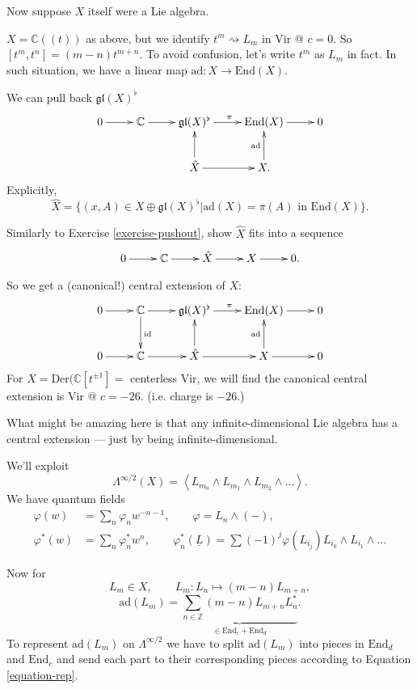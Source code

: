 \noindent
Now suppose $X$ itself were a Lie algebra.

\begin{example}
\label{example-with-X-lie-algebra}
$X=\mathbb{C}((t))$ as above, but we identify
$t^m \rightsquigarrow L_m$ in Vir @ $c=0$.
So  $[t^m,t^n]=(m-n)t^{m+n}$.
To avoid confusion, let's write $t^m$ as $L_m$ in fact.
In such situation, we have a linear map
$\text{ad}:X \to \text{End}(X)$.

We can pull back $\mathfrak{gl}(X)^\flat$ 
$$
\xymatrix{
0\ar[r]&\mathbb{C}\ar[r]
&\mathfrak{gl}(X)^\flat\ar[r]^\pi
&\text{End}(X)\ar[r]&0\\
&& \hat{X}\ar[r]\ar[u]& X\ar[u]^{\text{ad}}.
}
$$
Explicitly,
$$
\hat{X}=
\{(x,A) \in X \oplus \mathfrak{gl}(X)^\flat
|\text{ad}(X)=\pi(A) \text{ in }\text{End}(X)\}.
$$
\end{example}

\begin{exercise}
\label{exercise-pushout2}
Similarly to Exercise \ref{exercise-pushout},
show $\hat{X}$ fits into a sequence
$$
\xymatrix{
0\ar[r]&\mathbb{C}\ar[r]&\hat{X}\ar[r]&X\ar[r]&0.
}
$$
\end{exercise}
So we get a (canonical!) central extension of $X$:
$$
\xymatrix{
0\ar[r]&\mathbb{C}\ar[d]^{\text{id}}\ar[r]
&\mathfrak{gl}(X)^\flat\ar[r]^\pi
&\text{End}(X)\ar[r]&0\\
0\ar[r]&\mathbb{C}\ar[r]&\hat{X}\ar[u]\ar[r]& X\ar[u]^{\text{ad}}\ar[r]&0
}
$$
For $X=\text{Der}(\mathbb{C}[t^{\pm 1}]=$ centerless Vir,
we will find the canonical central extension is
Vir  @ $c=-26$. (i.e. charge is  $-26$.)

\noindent
What might be amazing here is that any infinite-dimensional
Lie algebra has a central extension --- just by being infinite-dimensional.

\medskip\noindent
We'll exploit
$$
\Lambda^{\infty/2}(X)
=\left<L_{m_0}\wedge L_{m_1}\wedge L_{m_2}\wedge\ldots\right>.
$$
We have quantum fields
\begin{align*}
\varphi(w)&=\sum_n\varphi_nw^{-n-1},\qquad 
\varphi=L_n \wedge(-),\\
\varphi^* (w)&=\sum_n \varphi_n^* w^n,\qquad 
\varphi_n^* (\underline{L})=
\sum(-1)^j\varphi(L_{i_j})L_{i_0}\wedge L_{i_1}\wedge\ldots
\end{align*}

\noindent
Now for 
$$
L_m \in X,\qquad  L_m :L_n \mapsto  (m-n)L_{m+n},
$$
$$
\text{ad}(L_m)=\underbrace{\sum_{n \in \mathbb{Z}}(m-n) L_{m+n}L_n^*}
_{\in \text{End}_c + \text{End}_d}.
$$
To represent $\text{ad}(L_m)$ on $\Lambda^{\infty/2}$ 
we have to split $\text{ad}(L_m)$ into pieces
in $\text{End}_d$ and $\text{End}_c$ and
send each part to their corresponding pieces
according to Equation \ref{equation-rep}.

